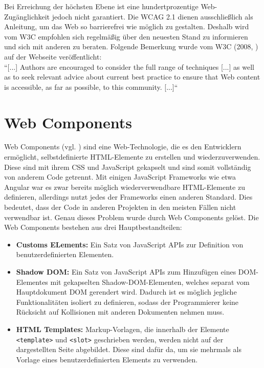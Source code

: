 Bei Erreichung der höchsten Ebene ist eine hundertprozentige Web-Zugänglichkeit jedoch nicht garantiert. Die WCAG 2.1 dienen ausschließlich als Anleitung, um das Web so barrierefrei wie möglich zu gestalten. Deshalb wird vom W3C empfohlen sich regelmäßig über den neuesten Stand zu informieren und sich mit anderen zu beraten. Folgende Bemerkung wurde vom W3C (2008, \cite{wcag_2_1_2018}) auf der Webseite veröffentlicht:\\
``[...] Authors are encouraged to consider the full range of techniques [...] as well as to seek relevant advice about current best practice to ensure that Web content is accessible, as far as possible, to this community. [...]``

\section{Web Components}
\label{web_comp}
Web Components (vgl. \cite{moz_webcomp_2019}) sind eine Web-Technologie, die es den Entwicklern ermöglicht, selbstdefinierte HTML-Elemente zu erstellen und wiederzuverwenden. Diese sind mit ihrem CSS und JavaScript gekapselt und sind somit vollständig von anderem Code getrennt. Mit einigen JavaScript Frameworks wie etwa Angular war es zwar bereits möglich wiederverwendbare HTML-Elemente zu definieren, allerdings nutzt jedes der Frameworks einen anderen Standard. Dies bedeutet, dass der Code in anderen Projekten in den meisten Fällen nicht verwendbar ist. Genau dieses Problem wurde durch Web Components gelöst. Die Web Components bestehen aus drei Hauptbestandteilen:

\begin{itemize}
	\item \textbf{Customs ELements:} Ein Satz von JavaScript APIs zur Definition von benutzerdefinierten Elementen.
	\item \textbf{Shadow DOM:} Ein Satz von JavaScript APIs zum Hinzufügen eines DOM-Elementes mit gekapselten Shadow-DOM-Elementen, welches separat vom Hauptdokument DOM gerendert wird. Dadurch ist es möglich jegliche Funktionalitäten isoliert zu definieren, sodass der Programmierer keine Rücksicht auf Kollisionen mit anderen Dokumenten nehmen muss.
	\item \textbf{HTML Templates:} Markup-Vorlagen, die innerhalb der Elemente \texttt{<template>} und \texttt{<slot>} geschrieben werden, werden nicht auf der dargestellten Seite abgebildet. Diese sind dafür da, um sie mehrmals als Vorlage eines benutzerdefinierten Elements zu verwenden.
\end{itemize}

